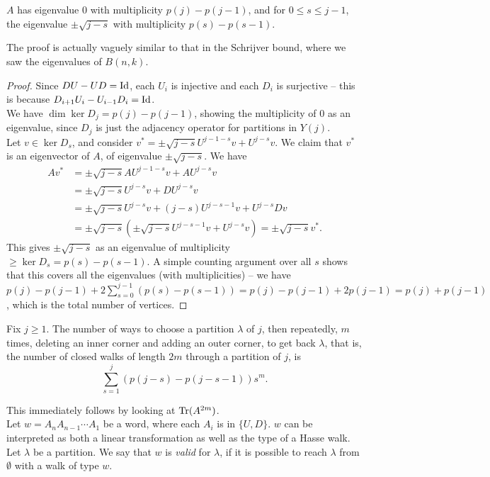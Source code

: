 \begin{ftheo}
	$A$ has eigenvalue $0$ with multiplicity $p(j) - p(j-1)$, and for $0 \le s \le j-1$, the eigenvalue $\pm \sqrt{j-s}$ with multiplicity $p(s)-p(s-1)$.
\end{ftheo}
The proof is actually vaguely similar to that in the Schrijver bound, where we saw the eigenvalues of $B(n,k)$.
\begin{proof}
	Since $DU-UD = \operatorname{Id}$, each $U_i$ is injective and each $D_i$ is surjective -- this is because $D_{i+1} U_i - U_{i-1} D_i = \operatorname{Id}$.\\
	We have $\dim \ker D_j = p(j) - p(j-1)$, showing the multiplicity of $0$ as an eigenvalue, since $D_j$ is just the adjacency operator for partitions in $Y(j)$.\\
	Let $v \in \ker D_s$, and consider $v^* = \pm \sqrt{j-s} U^{j-1-s}v + U^{j-s}v$. We claim that $v^*$ is an eigenvector of $A$, of eigenvalue $\pm\sqrt{j-s}$. We have
	\begin{align*}
		Av^* &= \pm\sqrt{j-s}AU^{j-1-s}v + AU^{j-s}v \\
			&= \pm\sqrt{j-s}U^{j-s}v + DU^{j-s}v \\
			&= \pm \sqrt{j-s}U^{j-s}v + (j-s)U^{j-s-1}v + U^{j-s}Dv \\
			&= \pm\sqrt{j-s}\left( \pm\sqrt{j-s}U^{j-s-1}v + U^{j-s}v \right) = \pm\sqrt{j-s}v^*.
	\end{align*}
	This gives $\pm \sqrt{j-s}$ as an eigenvalue of multiplicity $\ge \ker D_s = p(s) - p(s-1)$. A simple counting argument over all $s$ shows that this covers all the eigenvalues (with multiplicities) -- we have $p(j) - p(j-1) + 2\sum_{s=0}^{j-1} (p(s) - p(s-1)) = p(j) - p(j-1) + 2p(j-1) = p(j) + p(j-1)$, which is the total number of vertices.
\end{proof}

\begin{fcor}
	Fix $j \ge 1$. The number of ways to choose a partition $\lambda$ of $j$, then repeatedly, $m$ times, deleting an inner corner and adding an outer corner, to get back $\lambda$, that is, the number of closed walks of length $2m$ through a partition of $j$, is 
	\[ \sum_{s=1}^{j} (p(j-s) - p(j-s-1)) s^m. \]
\end{fcor}
This immediately follows by looking at $\operatorname{Tr}(A^{2m})$.\\

Let $w = A_n A_{n-1} \cdots A_1$ be a word, where each $A_i$ is in $\{U,D\}$. $w$ can be interpreted as both a linear transformation as well as the type of a Hasse walk.\\
Let $\lambda$ be a partition. We say that $w$ is \emph{valid} for $\lambda$, if it is possible to reach $\lambda$ from $\emptyset$ with a walk of type $w$.

